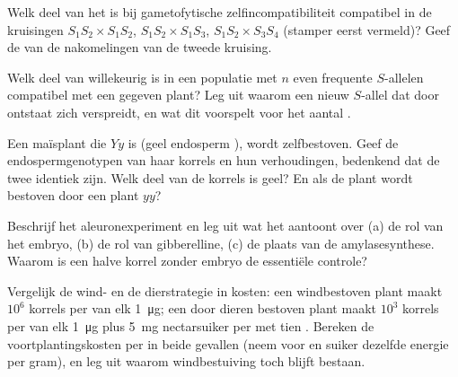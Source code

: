 \begin{exercise}[$\star\star$]\label{exo:b2:angiosperm-reproduction:6}
Welk deel van het  is bij gametofytische zelfincompatibiliteit
compatibel in de kruisingen $S_1S_2\times S_1S_2$, $S_1S_2\times
S_1S_3$, $S_1S_2\times S_3S_4$ (stamper eerst vermeld)? Geef de
 van de nakomelingen van de tweede kruising.
\end{exercise}

\begin{exercise}[$\star\star$]\label{exo:b2:angiosperm-reproduction:7}
Welk deel van willekeurig  is in een populatie met $n$ even
frequente $S$-allelen compatibel met een gegeven plant? Leg uit waarom een
nieuw $S$-allel dat door  ontstaat zich verspreidt, en wat dit
voorspelt voor het aantal .
\end{exercise}

\begin{exercise}[$\star\star$]\label{exo:b2:angiosperm-reproduction:8}
Een maïsplant die  $Yy$ is (geel endosperm ), wordt
zelfbestoven. Geef de endospermgenotypen van haar korrels en hun
verhoudingen, bedenkend dat de twee  identiek zijn.
Welk deel van de korrels is geel? En als de plant wordt bestoven
door een plant $yy$?
\end{exercise}

\begin{exercise}[$\star\star$]\label{exo:b2:angiosperm-reproduction:9}
Beschrijf het aleuronexperiment en leg uit wat het aantoont over
(a) de rol van het embryo, (b) de rol van gibberelline, (c) de
plaats van de amylasesynthese. Waarom is een halve korrel zonder embryo
de essentiële controle?
\end{exercise}

\begin{exercise}[$\star\star\star$]\label{exo:b2:angiosperm-reproduction:10}
Vergelijk de wind- en de dierstrategie in kosten: een windbestoven
plant maakt $10^{6}$ korrels per  van elk \qty{1}{\micro g};
een door dieren bestoven plant maakt $10^{3}$ korrels per  van
elk \qty{1}{\micro g} plus \qty{5}{mg} nectarsuiker per 
met tien . Bereken de voortplantingskosten per 
in beide gevallen (neem voor  en suiker dezelfde energie per
gram), en leg uit waarom windbestuiving toch blijft bestaan.
\end{exercise}

